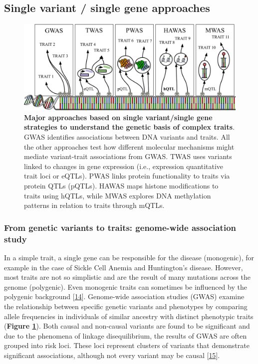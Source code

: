 \hypertarget{single-variant-single-gene-approaches}{%
\subsection{Single variant / single gene approaches}\label{single-variant-single-gene-approaches}}

\begin{figure}
\hypertarget{fig:fig1}{%
\centering
\includegraphics[width=1\textwidth,height=\textheight]{images/fig1.svg}
\caption{\textbf{Major approaches based on single variant/single gene strategies to understand the genetic basis of complex traits}.
GWAS identifies associations between DNA variants and traits.
All the other approaches test how different molecular mechanisms might mediate variant-trait associations from GWAS.
TWAS uses variants linked to changes in gene expression (i.e., expression quantitative trait loci or eQTLs).
PWAS links protein functionality to traits via protein QTLs (pQTLs).
HAWAS maps histone modifications to traits using hQTLs, while MWAS explores DNA methylation patterns in relation to traits through mQTLs.}\label{fig:fig1}
}
\end{figure}

\hypertarget{from-genetic-variants-to-traits-genome-wide-association-study}{%
\subsubsection{From genetic variants to traits: genome-wide association study}\label{from-genetic-variants-to-traits-genome-wide-association-study}}

In a simple trait, a single gene can be responsible for the disease (monogenic), for example in the case of Sickle Cell Anemia and Huntington's disease.
However, most traits are not so simplistic and are the result of many mutations across the genome (polygenic).
Even monogenic traits can sometimes be influenced by the polygenic background {[}\protect\hyperlink{ref-VqGYQMXO}{14}{]}.
Genome-wide association studies (GWAS) examine the relationship between specific genetic variants and phenotypes by comparing allele frequencies in individuals of similar ancestry with distinct phenotypic traits (\textbf{Figure \ref{fig:fig1}}).
Both causal and non-causal variants are found to be significant and due to the phenomena of linkage disequilibrium, the results of GWAS are often grouped into risk loci.
These loci represent clusters of variants that demonstrate significant associations, although not every variant may be causal {[}\protect\hyperlink{ref-1873zCaaX}{15}{]}.

